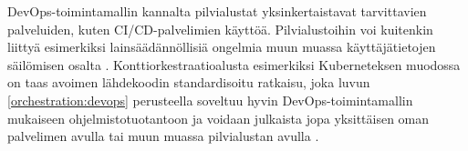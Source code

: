 DevOps-toimintamallin kannalta pilvialustat yksinkertaistavat tarvittavien palveluiden, kuten CI/CD-palvelimien käyttöä.
Pilvialustoihin voi kuitenkin liittyä esimerkiksi lainsäädännöllisiä ongelmia muun muassa käyttäjätietojen säilömisen osalta \cite{Barati22}.
Konttiorkestraatioalusta esimerkiksi Kuberneteksen muodossa on taas avoimen lähdekoodin standardisoitu ratkaisu, joka luvun \ref{orchestration:devops} perusteella soveltuu hyvin DevOps-toimintamallin mukaiseen ohjelmistotuotantoon ja voidaan julkaista jopa yksittäisen oman palvelimen avulla tai muun muassa pilvialustan avulla \cite{Muddinagiri19, Khan22}.

